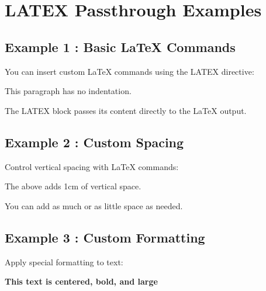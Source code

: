 \documentclass[a4paper,10pt,fleqn]{article}
\begin{document}
\section*{LATEX Passthrough Examples}

\subsection*{Example 1 : Basic LaTeX Commands}

\noindent You can insert custom LaTeX commands using the LATEX directive:

\bigskip

\noindent This paragraph has no indentation.

\noindent The LATEX block passes its content directly to the LaTeX output.

\bigskip

\subsection*{Example 2 : Custom Spacing}

\noindent Control vertical spacing with LaTeX commands:

\bigskip

\vspace{1cm}

\noindent The above adds 1cm of vertical space.

\bigskip

\vspace{0.5cm}

\noindent You can add as much or as little space as needed.

\bigskip

\subsection*{Example 3 : Custom Formatting}

\noindent Apply special formatting to text:

\bigskip

\begin{center}

\textbf{\Large This text is centered, bold, and large}

\end{center}
\end{document}
